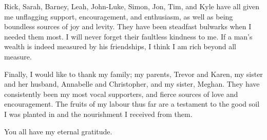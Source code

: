 \begin{acknowledgements}
{		Rick, Sarah, Barney, Leah, John-Luke, Simon, Jon, Tim, and Kyle have all given me 
		unflagging support, encouragement, and enthusiasm, as well as being boundless sources 
		of joy and levity. They have been steadfast bulwarks when I needed them most. I will 
		never forget their faultless kindness to me. If a man's wealth is indeed measured by 
		his friendships, I think I am rich beyond all measure.
		
		Finally, I would like to thank my family; my parents, Trevor and Karen, my 
		sister and her husband, Annabelle and Christopher, and my sister, Meghan. They
		have  consistently been my most vocal supporters, and fierce sources of love and
		encouragement. The fruits of my labour thus far are a testament to the good 
		soil I was planted in and the nourishment I received from them.
		
		You all have my eternal gratitude.}
	
\end{acknowledgements}
